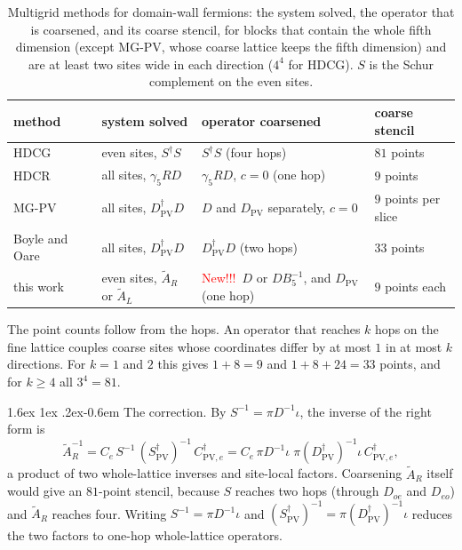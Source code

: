 \documentclass[11pt,a4paper]{article}
\makeatletter
\newif\ifshownew \shownewtrue
\DeclareRobustCommand\New{\ifshownew\textcolor{red}{New!!!}\ \else\ignorespaces\fi}
\renewcommand\paragraph{\@startsection{paragraph}{4}{\z@}%
  {1.6ex \@plus 1ex \@minus .2ex}{-0.6em}%
  {\normalfont\normalsize\itshape}}
\numberwithin{equation}{section}
\newcommand{\dg}{^{\dagger}}
\newcommand{\Dpv}{D_{\mathrm{PV}}}
\newcommand{\Spv}{S_{\mathrm{PV}}}
\newcommand{\AR}{\tilde A_{R}}
\newcommand{\AL}{\tilde A_{L}}
\newcommand{\Ce}{C_{e}}
\newcommand{\Cpve}{C_{\mathrm{PV},e}}
\makeatother
\begin{document}
\begin{table}[t]
\centering
\caption{Multigrid methods for domain-wall fermions: the system solved, the operator
that is coarsened, and its coarse stencil, for blocks that contain the whole fifth
dimension (except MG-PV, whose coarse lattice keeps the fifth dimension) and are at least two
sites wide in each direction ($4^4$ for HDCG). $S$ is
the Schur complement on the even sites.}
\label{tab:approaches}
\small
\renewcommand{\arraystretch}{1.15}
\begin{tabular}{@{}llll@{}}
\toprule
method & system solved & operator coarsened & coarse stencil\\
\midrule
HDCG~\cite{HDCG,BoyleMRHS} & even sites, $S\dg S$ & $S\dg S$ (four hops) & $81$ points\\
HDCR~\cite{HDCR} & all sites, $\gamma_5RD$ & $\gamma_5RD$, $c=0$ (one hop) & $9$ points\\
MG-PV~\cite{BCHW,BY} & all sites, $\Dpv\dg D$ & $D$ and $\Dpv$ separately, $c=0$ & $9$ points per slice\\
Boyle and Oare~\cite{BoyleOare} & all sites, $\Dpv\dg D$ & $\Dpv\dg D$ (two hops) & $33$ points\\
this work & even sites, $\AR$ or $\AL$ & \New $D$ or $DB_5^{-1}$, and $\Dpv$ (one hop) & $9$ points each\\
\bottomrule
\end{tabular}
\end{table}

The point counts follow from the hops. An operator that reaches $k$ hops on the fine lattice
couples coarse sites whose coordinates differ by at most $1$ in at most $k$ directions. For $k=1$
and $2$ this gives $1+8=9$ and $1+8+24=33$ points, and for $k\ge4$ all $3^4=81$.

\paragraph{The correction.} By $S^{-1}=\pi D^{-1}\iota$, the inverse of the right form is
\begin{equation}
\AR^{-1}=\Ce\,S^{-1}\,(\Spv\dg)^{-1}\,\Cpve\dg
=\Ce\,\pi D^{-1}\iota\;\pi(\Dpv\dg)^{-1}\iota\,\Cpve\dg ,
\label{eq:ARinv}
\end{equation}
a product of two whole-lattice inverses and site-local factors. Coarsening $\AR$ itself would give
an $81$-point stencil, because $S$ reaches two hops (through $D_{oe}$ and $D_{eo}$) and $\AR$
reaches four. Writing $S^{-1}=\pi D^{-1}\iota$ and $(\Spv\dg)^{-1}=\pi(\Dpv\dg)^{-1}\iota$
reduces the two factors to one-hop whole-lattice operators.
\end{document}
